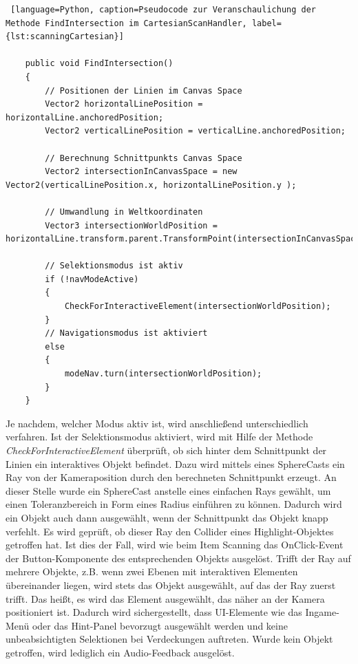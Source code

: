 \begin{lstlisting} [language=Python, caption=Pseudocode zur Veranschaulichung der Methode FindIntersection im CartesianScanHandler, label={lst:scanningCartesian}]

    public void FindIntersection()
    {
        // Positionen der Linien im Canvas Space
        Vector2 horizontalLinePosition = horizontalLine.anchoredPosition;
        Vector2 verticalLinePosition = verticalLine.anchoredPosition;
        
        // Berechnung Schnittpunkts Canvas Space
        Vector2 intersectionInCanvasSpace = new Vector2(verticalLinePosition.x, horizontalLinePosition.y );
        
        // Umwandlung in Weltkoordinaten
        Vector3 intersectionWorldPosition = horizontalLine.transform.parent.TransformPoint(intersectionInCanvasSpace);

        // Selektionsmodus ist aktiv
        if (!navModeActive)
	    {
            CheckForInteractiveElement(intersectionWorldPosition);
        }
        // Navigationsmodus ist aktiviert
        else
        {
            modeNav.turn(intersectionWorldPosition);
        }
    }

\end{lstlisting}

Je nachdem, welcher Modus aktiv ist, wird anschließend unterschiedlich verfahren. Ist der Selektionsmodus aktiviert, wird mit Hilfe der Methode \textit{CheckForInteractiveElement} überprüft, ob sich hinter dem Schnittpunkt der Linien ein interaktives Objekt befindet. Dazu wird mittels eines SphereCasts ein Ray von der Kameraposition durch den berechneten Schnittpunkt erzeugt. An dieser Stelle wurde ein SphereCast anstelle eines einfachen Rays gewählt, um einen Toleranzbereich in Form eines Radius einführen zu können. Dadurch wird ein Objekt auch dann ausgewählt, wenn der Schnittpunkt das Objekt knapp verfehlt. Es wird geprüft, ob dieser Ray den Collider eines Highlight-Objektes getroffen hat. Ist dies der Fall, wird wie beim Item Scanning das OnClick-Event der Button-Komponente des entsprechenden Objekts ausgelöst. Trifft der Ray auf mehrere Objekte, z.B. wenn zwei Ebenen mit interaktiven Elementen übereinander liegen, wird stets das Objekt ausgewählt, auf das der Ray zuerst trifft. Das heißt, es wird das Element ausgewählt, das näher an der Kamera positioniert ist. Dadurch wird sichergestellt, dass UI-Elemente wie das Ingame-Menü oder das Hint-Panel bevorzugt ausgewählt werden und keine unbeabsichtigten Selektionen bei Verdeckungen auftreten. Wurde kein Objekt getroffen, wird lediglich ein Audio-Feedback ausgelöst. 

